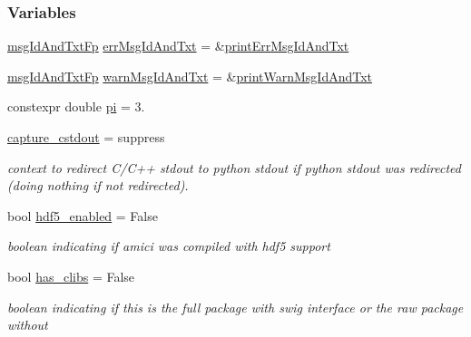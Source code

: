 \subsubsection*{Variables}
\begin{DoxyCompactItemize}
\item 
\mbox{\hyperlink{namespaceamici_a02384ab9af881494db3ed32cd6ecdcc0}{msg\+Id\+And\+Txt\+Fp}} \mbox{\hyperlink{namespaceamici_a19eefc037cc960b013cc0b724e5292b7}{err\+Msg\+Id\+And\+Txt}} = \&\mbox{\hyperlink{namespaceamici_ade28c6a7f1b5aee40bb2453fb61b4024}{print\+Err\+Msg\+Id\+And\+Txt}}
\item 
\mbox{\hyperlink{namespaceamici_a02384ab9af881494db3ed32cd6ecdcc0}{msg\+Id\+And\+Txt\+Fp}} \mbox{\hyperlink{namespaceamici_adb95b29229e987b4b0a55ade25961688}{warn\+Msg\+Id\+And\+Txt}} = \&\mbox{\hyperlink{namespaceamici_a14122f73594a970df27bfcb8fa0db35d}{print\+Warn\+Msg\+Id\+And\+Txt}}
\item 
constexpr double \mbox{\hyperlink{namespaceamici_ad172e8d1a294401209781f9aeaa77410}{pi}} = 3.
\item 
\mbox{\label{namespaceamici_a5268eab28418edafd6a909315e3cc3cd}} 
\mbox{\hyperlink{namespaceamici_a5268eab28418edafd6a909315e3cc3cd}{capture\+\_\+cstdout}} = suppress
\begin{DoxyCompactList}\small\item\em context to redirect C/\+C++ stdout to python stdout if python stdout was redirected (doing nothing if not redirected). \end{DoxyCompactList}\item 
\mbox{\label{namespaceamici_a58c12f0767223d7b6e2de58a32cab341}} 
bool \mbox{\hyperlink{namespaceamici_a58c12f0767223d7b6e2de58a32cab341}{hdf5\+\_\+enabled}} = False
\begin{DoxyCompactList}\small\item\em boolean indicating if amici was compiled with hdf5 support \end{DoxyCompactList}\item 
\mbox{\label{namespaceamici_a986356865d3cca4610b14c4c7c383fcb}} 
bool \mbox{\hyperlink{namespaceamici_a986356865d3cca4610b14c4c7c383fcb}{has\+\_\+clibs}} = False
\begin{DoxyCompactList}\small\item\em boolean indicating if this is the full package with swig interface or the raw package without \end{DoxyCompactList}\item 

\end{DoxyCompactItemize}
